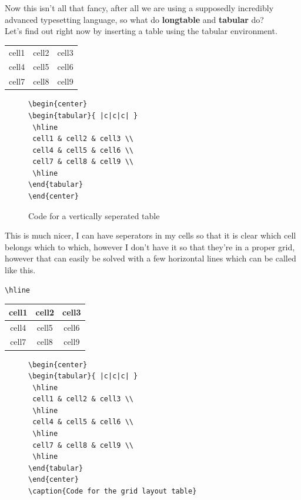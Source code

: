 \documentclass[12pt, letterpaper, oneside]{article} \usepackage[utf8]{inputenc}
\begin{document}
Now this isn't all that fancy, after all we are using a supposedly incredibly advanced typesetting language, so what do \textbf{longtable} and \textbf{tabular} do?
\\
Let's find out right now by inserting a table using the tabular environment.

\begin{center}
\begin{tabular}{ |c|c|c| } 
 \hline
 cell1 & cell2 & cell3 \\ 
 cell4 & cell5 & cell6 \\ 
 cell7 & cell8 & cell9 \\ 
 \hline
\end{tabular}
\end{center}

\begin{figure}[H]
	\centering
	\begin{lstlisting}
\begin{center}
\begin{tabular}{ |c|c|c| } 
 \hline
 cell1 & cell2 & cell3 \\ 
 cell4 & cell5 & cell6 \\ 
 cell7 & cell8 & cell9 \\ 
 \hline
\end{tabular}
\end{center}
	\end{lstlisting}
	\caption{Code for a vertically seperated table}
\end{figure}

This is much nicer, I can have seperators in my cells so that it is clear which cell belongs which to which, however I don't have it so that they're in a proper grid, however that can easily be solved with a few horizontal lines which can be called like this. 
\begin{lstlisting}
\hline
\end{lstlisting}

\begin{center}
\begin{tabular}{ |c|c|c| } 
 \hline
 cell1 & cell2 & cell3 \\ 
 \hline 
 cell4 & cell5 & cell6 \\ 
 \hline 
 cell7 & cell8 & cell9 \\ 
 \hline
\end{tabular}
\end{center}

\begin{figure}[H]
\begin{lstlisting}	
\begin{center}
\begin{tabular}{ |c|c|c| } 
 \hline
 cell1 & cell2 & cell3 \\ 
 \hline 
 cell4 & cell5 & cell6 \\ 
 \hline 
 cell7 & cell8 & cell9 \\ 
 \hline
\end{tabular}
\end{center}
\caption{Code for the grid layout table}
\end{lstlisting}
\end{figure}
\end{document}
